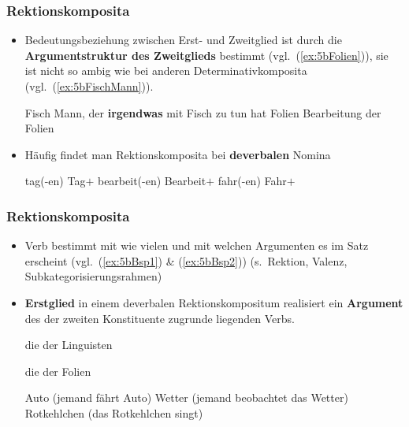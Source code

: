 \begin{frame}
\frametitle{Rektionskomposita}

\begin{itemize}
	\item Bedeutungsbeziehung zwischen Erst- und Zweitglied ist durch die \textbf{Argumentstruktur des Zweitglieds} bestimmt (vgl.\ (\ref{ex:5bFolien})), sie ist nicht so ambig wie bei anderen Determinativkomposita (vgl.\ (\ref{ex:5bFischMann})).
	
	\ea 
		\ea\label{ex:5bFischMann} Fisch \ras Mann, der \textbf{irgendwas} mit Fisch zu tun hat
		\ex\label{ex:5bFolien} Folien \ras Bearbeitung der Folien
		\z 	
	\z 
\end{itemize}

\begin{itemize}
	\item Häufig findet man Rektionskomposita bei \textbf{deverbalen} Nomina
	

	\ea 
		\ea tag(-en) \ras Tag$+$
		\ex bearbeit(-en) \ras Bearbeit$+$
		\ex fahr(-en) \ras Fahr$+$		
		\z 
	\z 
	
\end{itemize}


\end{frame}


\begin{frame}
\frametitle{Rektionskomposita}

\begin{itemize}
	
	\item Verb bestimmt mit wie vielen und mit welchen Argumenten es im Satz erscheint (vgl.\ (\ref{ex:5bBsp1}) \& (\ref{ex:5bBsp2})) (s.\ Rektion, Valenz, Subkategorisierungsrahmen)
	
	\item \textbf{Erstglied} in einem deverbalen Rektionskompositum realisiert ein \textbf{Argument} des der zweiten Konstituente zugrunde liegenden Verbs.

	\settowidth\jamwidth{[2 ArgumenteX]} 
	\ea \label{ex:5bBsp1} 
		\jambox{[1 Argument]}
		\ex die  der Linguisten 
		\ex {}
		\z 

	\ex \label{ex:5bBsp2} 
		\jambox{[2 Argumente]}
		\ex die  der Folien
		\ex {}
		\z 
	\z
	
	\ea	 
		\ea Auto (jemand fährt Auto)
		\ex Wetter (jemand beobachtet das Wetter)
		\ex Rotkehlchen (das Rotkehlchen singt)
		\z 
	\z
		 
\end{itemize}

\end{frame}


